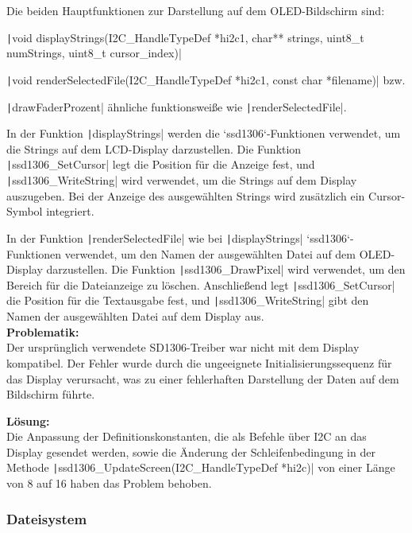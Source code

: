 Die beiden Hauptfunktionen zur Darstellung auf dem OLED-Bildschirm sind:

 \texttt|void  displayStrings(I2C_HandleTypeDef *hi2c1, char** strings, uint8_t numStrings, uint8_t cursor_index)|
 
 \texttt|void renderSelectedFile(I2C_HandleTypeDef *hi2c1, const char *filename)| bzw. 
 
 \texttt|drawFaderProzent| ähnliche funktionsweiße wie  \texttt|renderSelectedFile|. 


In der Funktion \texttt|displayStrings| werden die `ssd1306`-Funktionen verwendet, um die Strings auf dem LCD-Display darzustellen. Die Funktion \texttt|ssd1306_SetCursor| legt die Position für die Anzeige fest, und \texttt|ssd1306_WriteString| wird verwendet, um die Strings auf dem Display auszugeben. Bei der Anzeige des ausgewählten Strings wird zusätzlich ein Cursor-Symbol integriert.

In der Funktion \texttt|renderSelectedFile| wie bei \texttt|displayStrings| `ssd1306`-Funktionen verwendet, um den Namen der ausgewählten Datei auf dem OLED-Display darzustellen. Die Funktion \texttt|ssd1306_DrawPixel| wird verwendet, um den Bereich für die Dateianzeige zu löschen. Anschließend legt \texttt|ssd1306_SetCursor| die Position für die Textausgabe fest, und \texttt|ssd1306_WriteString| gibt den Namen der ausgewählten Datei auf dem Display aus. \\

\textbf{Problematik:} \\

Der ursprünglich verwendete SD1306-Treiber war nicht mit dem Display kompatibel. Der Fehler wurde durch die ungeeignete Initialisierungssequenz für das Display verursacht, was zu einer fehlerhaften Darstellung der Daten auf dem Bildschirm führte.

\textbf{Lösung:} \\

Die Anpassung der Definitionskonstanten, die als Befehle über I2C an das Display gesendet werden, sowie die Änderung der Schleifenbedingung in der Methode \texttt|ssd1306_UpdateScreen(I2C_HandleTypeDef *hi2c)| von einer Länge von 8 auf 16 haben das Problem behoben.
\newpage


\subsubsection{Dateisystem} 
\vspace{1em}

